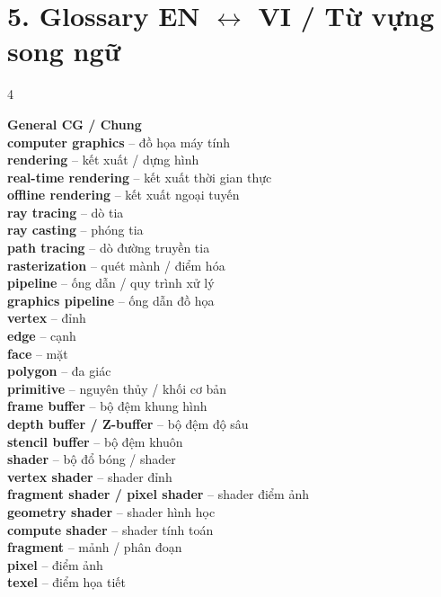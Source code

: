 \section*{5. Glossary EN $\leftrightarrow$ VI / Từ vựng song ngữ}
\scriptsize
\begin{multicols}{4}
\raggedright
\setlength{\parskip}{0pt}
\setlength{\parindent}{0pt}

\textbf{General CG / Chung}\\
\textbf{computer graphics} -- đồ họa máy tính\\
\textbf{rendering} -- kết xuất / dựng hình\\
\textbf{real-time rendering} -- kết xuất thời gian thực\\
\textbf{offline rendering} -- kết xuất ngoại tuyến\\
\textbf{ray tracing} -- dò tia\\
\textbf{ray casting} -- phóng tia\\
\textbf{path tracing} -- dò đường truyền tia\\
\textbf{rasterization} -- quét mành / điểm hóa\\
\textbf{pipeline} -- ống dẫn / quy trình xử lý\\
\textbf{graphics pipeline} -- ống dẫn đồ họa\\
\textbf{vertex} -- đỉnh\\
\textbf{edge} -- cạnh\\
\textbf{face} -- mặt\\
\textbf{polygon} -- đa giác\\
\textbf{primitive} -- nguyên thủy / khối cơ bản\\
\textbf{frame buffer} -- bộ đệm khung hình\\
\textbf{depth buffer / Z-buffer} -- bộ đệm độ sâu\\
\textbf{stencil buffer} -- bộ đệm khuôn\\
\textbf{shader} -- bộ đổ bóng / shader\\
\textbf{vertex shader} -- shader đỉnh\\
\textbf{fragment shader / pixel shader} -- shader điểm ảnh\\
\textbf{geometry shader} -- shader hình học\\
\textbf{compute shader} -- shader tính toán\\
\textbf{fragment} -- mảnh / phân đoạn\\
\textbf{pixel} -- điểm ảnh\\
\textbf{texel} -- điểm họa tiết\\

\end{multicols}
